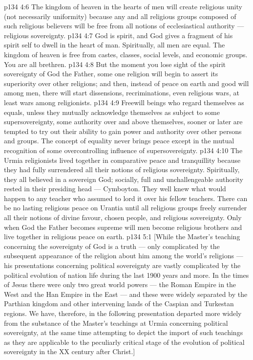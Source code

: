 \vs p134 4:6 The kingdom of heaven in the hearts of men will create religious unity (not necessarily uniformity) because any and all religious groups composed of such religious believers will be free from all notions of ecclesiastical authority --- religious sovereignty.
\vs p134 4:7 God is spirit, and God gives a fragment of his spirit self to dwell in the heart of man. Spiritually, all men are equal. The kingdom of heaven is free from castes, classes, social levels, and economic groups. You are all brethren.
\vs p134 4:8 But the moment you lose sight of the spirit sovereignty of God the Father, some one religion will begin to assert its superiority over other religions; and then, instead of peace on earth and good will among men, there will start dissensions, recriminations, even religious wars, at least wars among religionists.
\vs p134 4:9 Freewill beings who regard themselves as equals, unless they mutually acknowledge themselves as subject to some supersovereignty, some authority over and above themselves, sooner or later are tempted to try out their ability to gain power and authority over other persons and groups. The concept of equality never brings peace except in the mutual recognition of some overcontrolling influence of supersovereignty.
\vs p134 4:10 The Urmia religionists lived together in comparative peace and tranquillity because they had fully surrendered all their notions of religious sovereignty. Spiritually, they all believed in a sovereign God; socially, full and unchallengeable authority rested in their presiding head --- Cymboyton. They well knew what would happen to any teacher who assumed to lord it over his fellow teachers. There can be no lasting religious peace on Urantia until all religious groups freely surrender all their notions of divine favour, chosen people, and religious sovereignty. Only when God the Father becomes supreme will men become religious brothers and live together in religious peace on earth.
\vs p134 5:1 [While the Master’s teaching concerning the sovereignty of God is a truth --- only complicated by the subsequent appearance of the religion about him among the world’s religions --- his presentations concerning political sovereignty are vastly complicated by the political evolution of nation life during the last 1900 years and more. In the times of Jesus there were only two great world powers --- the Roman Empire in the West and the Han Empire in the East --- and these were widely separated by the Parthian kingdom and other intervening lands of the Caspian and Turkestan regions. We have, therefore, in the following presentation departed more widely from the substance of the Master’s teachings at Urmia concerning political sovereignty, at the same time attempting to depict the import of such teachings as they are applicable to the peculiarly critical stage of the evolution of political sovereignty in the XX century after Christ.]
